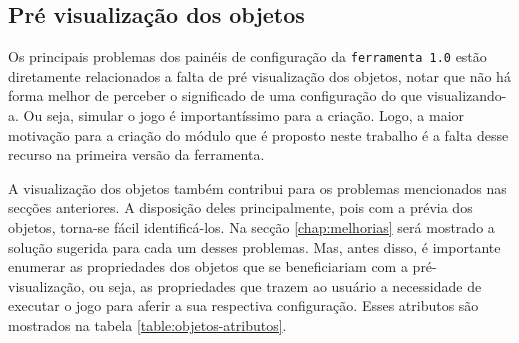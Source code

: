 \documentclass[12pt,twoside,openright,a4paper,english,brazil,sumario=tradicional]{abntex2}
\begin{document}
\subsection{Pré visualização dos objetos}
\label{sec:previa-objetos}
Os principais problemas dos painéis de configuração da \texttt{ferramenta 1.0} estão diretamente relacionados a falta de pré visualização dos objetos, notar que não há forma melhor de perceber o significado de uma configuração do que visualizando-a. Ou seja, simular o jogo é importantíssimo para a criação. Logo, a maior motivação para a criação do módulo que é proposto neste trabalho é a falta desse recurso na primeira versão da ferramenta.

A visualização dos objetos também contribui para os problemas mencionados nas secções anteriores. A disposição deles principalmente, pois com a prévia dos objetos, torna-se fácil identificá-los. Na secção \ref{chap:melhorias} será mostrado a solução sugerida para cada um desses problemas. Mas, antes disso, é importante enumerar as propriedades dos objetos que se beneficiariam com a pré-visualização, ou seja, as propriedades que trazem ao usuário a necessidade de executar o jogo para aferir a sua respectiva configuração. Esses atributos são mostrados na tabela \ref{table:objetos-atributos}.
\end{document}
